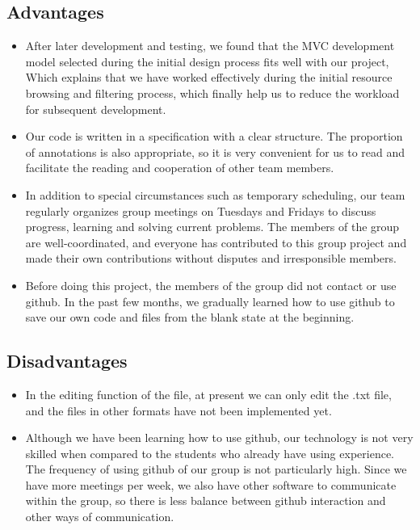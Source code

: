 \subsection{Advantages}
\begin{itemize}
    \item After later development and testing, we found that the MVC development model selected during the initial design process fits well with our project, Which explains that we have worked effectively during the initial resource browsing and filtering process, which finally help us to reduce the workload for subsequent development.
    \item Our code is written in a specification with a clear structure. The proportion of annotations is also appropriate, so it is very convenient for us to read and facilitate the reading and cooperation of other team members.
    \item In addition to special circumstances such as temporary scheduling, our team regularly organizes group meetings on Tuesdays and Fridays to discuss progress, learning and solving current problems. The members of the group are well-coordinated, and everyone has contributed to this group project and made their own contributions without disputes and irresponsible members.
    \item Before doing this project, the members of the group did not contact or use github. In the past few months, we gradually learned how to use github to save our own code and files from the blank state at the beginning.
    
\end{itemize}


\subsection{Disadvantages}
\begin{itemize}
    \item In the editing function of the file, at present we can only edit the .txt file, and the files in other formats have not been implemented yet.
    \item Although we have been learning how to use github, our technology is not very skilled when compared to the students who already have using experience. The frequency of using github of our group is not particularly high. Since we have more meetings per week, we also have other software to communicate within the group, so there is less balance between github interaction and other ways of communication.
\end{itemize}

